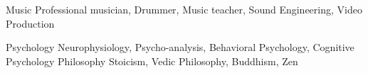 

\begin{cvskills}
  \cvskill
    {Music} %
    {Professional musician, Drummer, Music teacher, Sound Engineering, Video Production} %

  \cvskill
    {Psychology} %
    {Neurophysiology, Psycho-analysis, Behavioral Psychology, Cognitive Psychology} %
  \cvskill
    {Philosophy} %
    {Stoicism, Vedic Philosophy, Buddhism, Zen} %
\end{cvskills}
